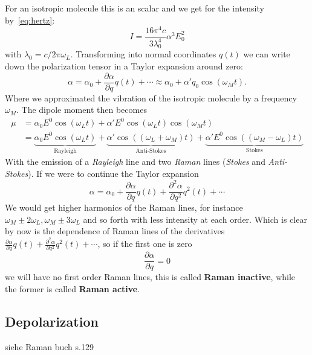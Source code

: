 For an isotropic molecule this is an scalar and we get
for the intensity by~\eqref{eq:hertz}:
\begin{equation}
    I = \frac{16 \pi^4 c}{3 \lambda_0^4} \alpha ^3 E_0 ^2
\end{equation}
with $\lambda_0 = c/ 2\pi \omega_L$. Transforming into normal coordinates $q(t)$ we can write down the polarization tensor
in a Taylor expansion around zero\cite{ver}:
\begin{equation}
    \alpha = \alpha_0 + \frac{\partial\alpha}{\partial q}q(t) + \cdots \approx \alpha_0 + \alpha' q_0 \cos(\omega_M t).
\end{equation}
Where we approximated the vibration of the isotropic molecule by a frequency $\omega_M$.
The dipole moment then becomes
\begin{align}
    \mu &= \alpha_0 E^0 \cos(\omega_L t) + \alpha' E^0 \cos(\omega_L t) \cos(\omega_M t) \\
        &= \underbrace{\alpha_0 E^0 \cos(\omega_L t) }_{\text{Rayleigh}}
    + \underbrace{\alpha '\cos((\omega_L + \omega_M)t ) }_{\text{Anti-Stokes}}
    + \underbrace{\alpha ' E^0\cos((\omega_M - \omega_L)t)}_{\text{Stokes}}
\end{align}
With the emission of a \textit{Rayleigh} line and two \textit{Raman} lines (\textit{Stokes} and \textit{Anti-Stokes}).
If we were to continue the Taylor expansion
\begin{equation}
    \alpha = \alpha_0 + \frac{\partial\alpha}{\partial q}q(t) + \frac{\partial^2\alpha}{\partial q^2}q^2(t) + \cdots
\end{equation}
We would get higher harmonics of the Raman lines, for instance $\omega_M \pm 2\omega_L, \omega_M \pm 3\omega_L$ and so
forth with less intensity at each order. 
Which is clear by now is the dependence of Raman lines of the
derivatives $\frac{\partial\alpha}{\partial q}q(t) + \frac{\partial^2\alpha}{\partial q^2}q^2(t) + \cdots$, so if 
the first one is zero
\begin{equation}
    \frac{\partial\alpha}{\partial q} = 0
\end{equation}
we will have no first order Raman lines, this is called \textbf{Raman inactive}, while the former is called
\textbf{Raman active}.  



\subsection{Depolarization}

siehe Raman buch s.129
